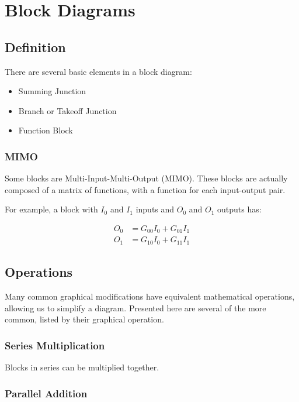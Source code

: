 \documentclass{../templates/topic}
\begin{document}
\chapter{Block Diagrams}

\section{Definition}
There are several basic elements in a block diagram:

\begin{itemize}
	\item Summing Junction
	\item Branch or Takeoff Junction
	\item Function Block
\end{itemize}

\subsection{MIMO}

Some blocks are Multi-Input-Multi-Output (MIMO).
These blocks are actually composed of a matrix of functions, with a function for each input-output pair.

For example, a block with $I_0$ and $I_1$ inputs and $O_0$ and $O_1$ outputs has:

\begin{align*}
	O_0 &= G_{00}I_0 + G_{01}I_1 \\
	O_1 &= G_{10}I_0 + G_{11}I_1
\end{align*}



\section{Operations}

Many common graphical modifications have equivalent mathematical operations, allowing us to simplify a diagram. Presented here are several of the more common, listed by their graphical operation.

\subsection{Series Multiplication}

Blocks in series can be multiplied together.

\subsection{Parallel Addition}
\end{document}
